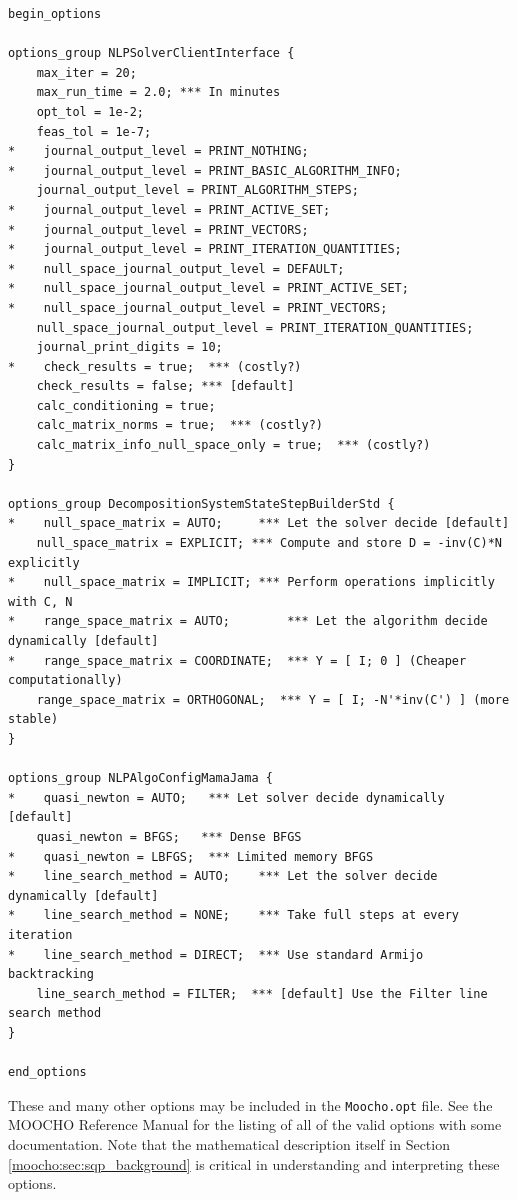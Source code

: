 \documentclass[pdf,12pt,report]{SANDreport}
\begin{document}
{\scriptsize\begin{verbatim}
begin_options

options_group NLPSolverClientInterface {
    max_iter = 20;
    max_run_time = 2.0; *** In minutes
    opt_tol = 1e-2;
    feas_tol = 1e-7;
*    journal_output_level = PRINT_NOTHING;
*    journal_output_level = PRINT_BASIC_ALGORITHM_INFO;
    journal_output_level = PRINT_ALGORITHM_STEPS;
*    journal_output_level = PRINT_ACTIVE_SET;
*    journal_output_level = PRINT_VECTORS;
*    journal_output_level = PRINT_ITERATION_QUANTITIES;
*    null_space_journal_output_level = DEFAULT;
*    null_space_journal_output_level = PRINT_ACTIVE_SET;
*    null_space_journal_output_level = PRINT_VECTORS;
    null_space_journal_output_level = PRINT_ITERATION_QUANTITIES;
    journal_print_digits = 10;
*    check_results = true;  *** (costly?)
    check_results = false; *** [default]
    calc_conditioning = true;
    calc_matrix_norms = true;  *** (costly?)
    calc_matrix_info_null_space_only = true;  *** (costly?)
}

options_group DecompositionSystemStateStepBuilderStd {
*    null_space_matrix = AUTO;     *** Let the solver decide [default]
    null_space_matrix = EXPLICIT; *** Compute and store D = -inv(C)*N explicitly
*    null_space_matrix = IMPLICIT; *** Perform operations implicitly with C, N
*    range_space_matrix = AUTO;        *** Let the algorithm decide dynamically [default]
*    range_space_matrix = COORDINATE;  *** Y = [ I; 0 ] (Cheaper computationally)
    range_space_matrix = ORTHOGONAL;  *** Y = [ I; -N'*inv(C') ] (more stable)
}

options_group NLPAlgoConfigMamaJama {
*    quasi_newton = AUTO;   *** Let solver decide dynamically [default]
    quasi_newton = BFGS;   *** Dense BFGS
*    quasi_newton = LBFGS;  *** Limited memory BFGS
*    line_search_method = AUTO;    *** Let the solver decide dynamically [default]
*    line_search_method = NONE;    *** Take full steps at every iteration
*    line_search_method = DIRECT;  *** Use standard Armijo backtracking
    line_search_method = FILTER;  *** [default] Use the Filter line search method
}

end_options

\end{verbatim}}

These and many other options may be included in the {}\texttt{Moocho.opt}
file.  See the MOOCHO Reference Manual {}\cite{ref:moochorefguide} for the
listing of all of the valid options with some documentation.  Note that the
mathematical description itself in Section {}\ref{moocho:sec:sqp_background}
is critical in understanding and interpreting these options.
\end{document}
